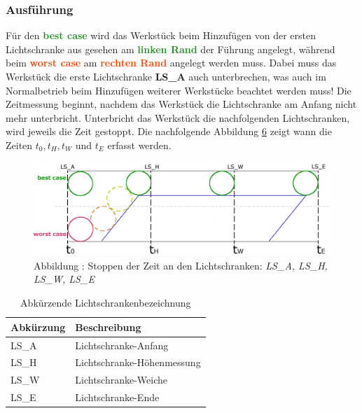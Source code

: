\documentclass[a4paper, 11pt]{article}
\begin{document}
\subsubsection{Ausführung}
Für den \textbf{\textcolor{ForestGreen}{best case}} wird das Werkstück beim Hinzufügen von der ersten Lichtschranke aus gesehen am \textbf{\textcolor{ForestGreen}{linken Rand}} der Führung angelegt, während beim \textbf{\textcolor{OrangeRed}{worst case}} am \textbf{\textcolor{OrangeRed}{rechten Rand}} angelegt werden muss. Dabei muss das Werkstück die erste Lichtschranke \textbf{LS\_A} auch unterbrechen, was auch im Normalbetrieb beim Hinzufügen weiterer Werkstücke beachtet werden muss! Die Zeitmessung beginnt, nachdem das Werkstück die Lichtschranke am Anfang nicht mehr unterbricht. Unterbricht das Werkstück die nachfolgenden Lichtschranken, wird jeweils die Zeit gestoppt. Die nachfolgende Abbildung \hyperref[sec:Messpunkte]{6} zeigt wann die Zeiten $t_0, t_H, t_W$ und $t_E$ erfasst werden.

\begin{figure}[h]
\centering 
    \includegraphics[scale=0.6]{images/Zeitmessung_Platzierung.png}
    \caption*{Abbildung \theimgcounter : Stoppen der Zeit an den Lichtschranken: \textit{LS\_A, LS\_H, LS\_W, LS\_E}}
    \label{sec:Messpunkte}
\end{figure}

\begin{table}[H]
\centering
    \begin{tabularx}{\textwidth}{|X|X|}
        \hline
        \textbf{Abkürzung}&\textbf{Beschreibung}\\
        \hline
        LS\_A & Lichtschranke-Anfang\\
        \hline
        LS\_H & Lichtschranke-Höhenmessung\\
        \hline
        LS\_W & Lichtschranke-Weiche\\
        \hline
        LS\_E & Lichtschranke-Ende\\
        \hline
    \end{tabularx}
\caption{Abkürzende Lichtschrankenbezeichnung}
\label{lbdesc}
\end{table}
\end{document}
